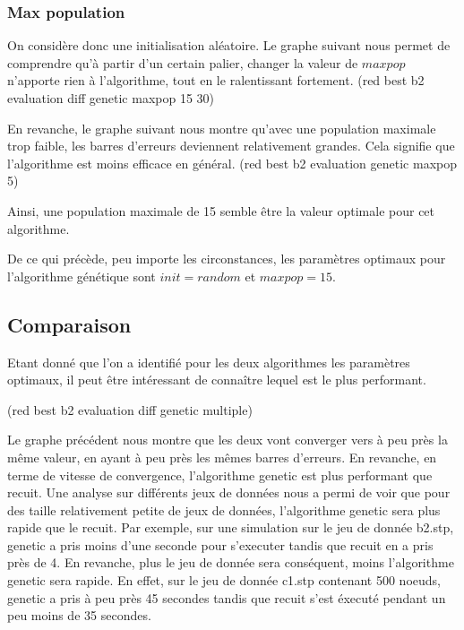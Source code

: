 \documentclass[11pt,french]{report}
\begin{document}
        \subsubsection{Max population}
        On considère donc une initialisation aléatoire. Le graphe suivant nous permet de comprendre qu'à partir d'un certain palier, changer la valeur de $maxpop$ n'apporte rien à l'algorithme, tout en le ralentissant fortement. ({{red} best b2 evaluation diff genetic maxpop 15 30})

        En revanche, le graphe suivant nous montre qu'avec une population maximale trop faible, les barres d'erreurs deviennent relativement grandes. Cela signifie que l'algorithme est moins efficace en général. ({{red} best b2 evaluation genetic maxpop 5})

        Ainsi, une population maximale de 15 semble être la valeur optimale pour cet algorithme.


        De ce qui précède, peu importe les circonstances, les paramètres optimaux pour l'algorithme génétique sont $init = random$ et $maxpop = 15$.

        \subsection{Comparaison}
        Etant donné que l'on a identifié pour les deux algorithmes les paramètres optimaux, il peut être intéressant de connaître lequel est le plus performant.

        ({{red} best b2 evaluation diff genetic multiple})

        Le graphe précédent nous montre que les deux vont converger vers à peu près la même valeur, en ayant à peu près les mêmes barres d'erreurs. En revanche, en terme de vitesse de convergence, l'algorithme genetic est plus performant que recuit.
        Une analyse sur différents jeux de données nous a permi de voir que pour des taille relativement petite de jeux de données, l'algorithme genetic sera plus rapide que le recuit. Par exemple, sur une simulation sur le jeu de donnée b2.stp, genetic a pris moins d'une seconde pour s'executer tandis que recuit en a pris près de 4.
        En revanche, plus le jeu de donnée sera conséquent, moins l'algorithme genetic sera rapide. En effet, sur le jeu de donnée c1.stp contenant 500 noeuds, genetic a pris à peu près 45 secondes tandis que recuit s'est éxecuté pendant un peu moins de 35 secondes.
        
\end{document}
